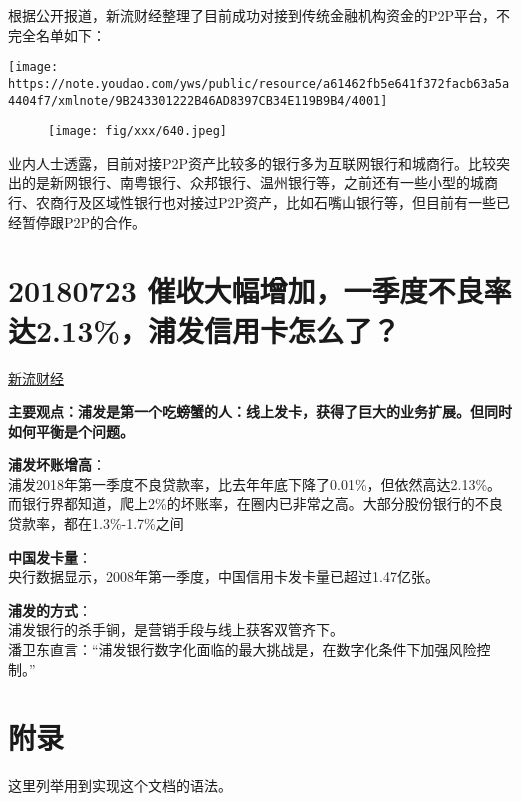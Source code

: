\documentclass[]{article}
\begin{document}
根据公开报道，新流财经整理了目前成功对接到传统金融机构资金的P2P平台，不完全名单如下：

\texttt{[image: https://note.youdao.com/yws/public/resource/a61462fb5e641f372facb63a5a4404f7/xmlnote/9B243301222B46AD8397CB34E119B9B4/4001]}

\begin{figure}
\centering
\texttt{[image: fig/xxx/640.jpeg]}
\caption{}
\end{figure}

业内人士透露，目前对接P2P资产比较多的银行多为互联网银行和城商行。比较突出的是新网银行、南粤银行、众邦银行、温州银行等，之前还有一些小型的城商行、农商行及区域性银行也对接过P2P资产，比如石嘴山银行等，但目前有一些已经暂停跟P2P的合作。

\section{20180723
催收大幅增加，一季度不良率达2.13\%，浦发信用卡怎么了？}\label{2.13}

\href{https://mp.weixin.qq.com/s/PFAU7Nw6sWgDM2535OQdrw}{新流财经}

\textbf{主要观点：浦发是第一个吃螃蟹的人：线上发卡，获得了巨大的业务扩展。但同时如何平衡是个问题。}

\textbf{浦发坏账增高}：\\
浦发2018年第一季度不良贷款率，比去年年底下降了0.01\%，但依然高达2.13\%。而银行界都知道，爬上2\%的坏账率，在圈内已非常之高。大部分股份银行的不良贷款率，都在1.3\%-1.7\%之间

\textbf{中国发卡量}：\\
央行数据显示，2008年第一季度，中国信用卡发卡量已超过1.47亿张。

\textbf{浦发的方式}：\\
浦发银行的杀手锏，是营销手段与线上获客双管齐下。\\
潘卫东直言：``浦发银行数字化面临的最大挑战是，在数字化条件下加强风险控制。''

\section*{附录}

这里列举用到实现这个文档的语法。
\end{document}
